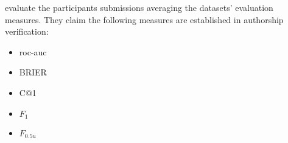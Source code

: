 \citet{ayele_overview_nodate} evaluate the participants submissions averaging the datasets' evaluation measures.
They claim the following measures are established in authorship verification:
\begin{itemize}
    \item \ac{roc-auc}
    \item BRIER
    \item C@1
    \item $F_1$
    \item $F_{0.5u}$
\end{itemize}